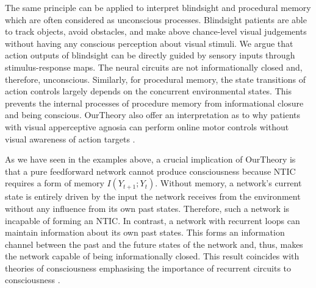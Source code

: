 \documentclass[utf8]{article}
\begin{document}
        		The same principle can be applied to interpret blindsight \citep{humphrey1999history, humphrey1974vision, Humphrey1970} and procedural memory \citep{doyon2009contributions, ashby2010cortical} which are often considered as unconscious processes. Blindsight patients are able to track objects, avoid obstacles, and make above chance-level visual judgements without having any conscious perception about visual stimuli. We argue that action outputs of blindsight can be directly guided by sensory inputs through stimulus-response maps. The neural circuits are not informationally closed and, therefore, unconscious. Similarly, for procedural memory, the state transitions of action controls largely depends on the concurrent environmental states. This prevents the internal processes of procedure memory from informational closure and being conscious. \ac{OurTheory} also offer an interpretation as to why patients with visual apperceptive agnosia \citep{james2003ventral} can perform online motor controls without visual awareness of action targets \citep{10.3389/fneur.2014.00255}. 

        		
        		As we have seen in the examples above, a crucial implication of \ac{OurTheory} is that a pure feedforward network cannot produce consciousness because NTIC requires a form of memory $I(Y_{t+1};Y_{t})$. Without memory, a network's current state is entirely driven by the input the network receives from the environment without any influence from its own past states. Therefore, such a network is incapable of forming an NTIC. In contrast, a network with recurrent loops can maintain information about its own past states. This forms an information channel between the past and the future states of the network and, thus, makes the network capable of being informationally closed. This result coincides with theories of consciousness emphasising the importance of recurrent circuits to consciousness \citep{lamme2006towards, edelman1992bright, tononi2008neural}.
        		
\end{document}
